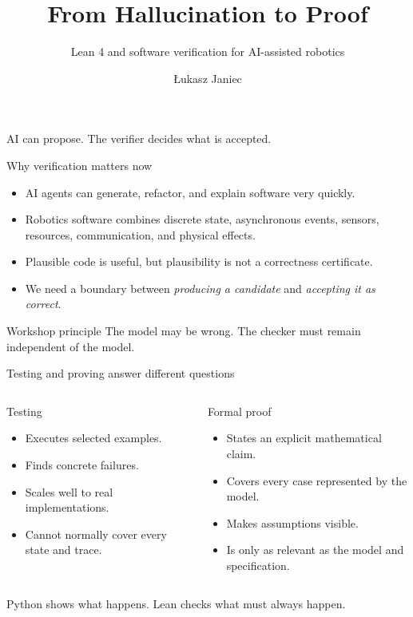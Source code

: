 \documentclass[aspectratio=169,10pt]{beamer}
\title{From Hallucination to Proof}
\subtitle{Lean 4 and software verification for AI-assisted robotics}
\author{Łukasz Janiec}
\institute{Wrocław University of Science and Technology}
\date{}
\begin{document}
\begin{frame}
  \titlepage
  \begin{center}
    \alert{AI can propose. The verifier decides what is accepted.}
  \end{center}
\end{frame}

\begin{frame}{Why verification matters now}
  \begin{itemize}
    \item AI agents can generate, refactor, and explain software very quickly.
    \item Robotics software combines discrete state, asynchronous events,
          sensors, resources, communication, and physical effects.
    \item Plausible code is useful, but plausibility is not a correctness
          certificate.
    \item We need a boundary between \emph{producing a candidate} and
          \emph{accepting it as correct}.
  \end{itemize}

  \begin{block}{Workshop principle}
    The model may be wrong. The checker must remain independent of the model.
  \end{block}
\end{frame}

\begin{frame}{Testing and proving answer different questions}
  \begin{columns}[T,onlytextwidth]
      \begin{block}{Testing}
        \begin{itemize}
          \item Executes selected examples.
          \item Finds concrete failures.
          \item Scales well to real implementations.
          \item Cannot normally cover every state and trace.
        \end{itemize}
      \end{block}

      \begin{block}{Formal proof}
        \begin{itemize}
          \item States an explicit mathematical claim.
          \item Covers every case represented by the model.
          \item Makes assumptions visible.
          \item Is only as relevant as the model and specification.
        \end{itemize}
      \end{block}
  \end{columns}

  \vspace{0.5em}
  \centering
  \alert{Python shows what happens. Lean checks what must always happen.}
\end{frame}
\end{document}
